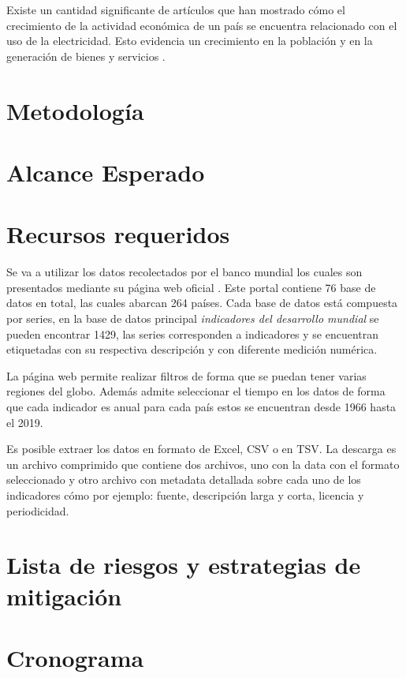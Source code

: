 \documentclass{article}
\begin{document}
Existe un cantidad significante de artículos que han mostrado cómo el crecimiento  de la actividad económica de un país se encuentra relacionado con el uso de la electricidad. Esto evidencia un crecimiento en la población y en la generación de bienes y servicios \cite{chen_relationship_2007}. 



\section{Metodología }

\section{Alcance Esperado}

\section{Recursos requeridos}

Se va a utilizar los datos recolectados por el banco mundial los cuales son presentados mediante su página web oficial \cite{noauthor_indicadores_nodate}. Este portal contiene 76 base de datos en total, las cuales abarcan 264 países. Cada base de datos está compuesta por series, en la base de datos principal \textit{indicadores del desarrollo mundial} se pueden encontrar 1429, las series corresponden a indicadores y se encuentran etiquetadas con su respectiva descripción y con diferente medición numérica.

La página web permite realizar filtros de forma que se puedan tener varias regiones del globo. Además admite seleccionar el tiempo en los datos de forma que cada indicador es anual para cada país estos se encuentran desde 1966 hasta el 2019. 

Es posible extraer los datos en formato de Excel, CSV o en TSV. La descarga es un archivo comprimido que contiene dos archivos, uno con la data con el formato seleccionado y otro  archivo con metadata detallada sobre cada uno de los indicadores cómo por ejemplo: fuente, descripción larga y corta, licencia y periodicidad. 


\section{Lista de riesgos y estrategias de mitigación}

\section{Cronograma}
\end{document}

